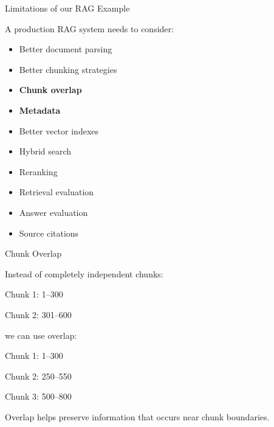 \documentclass[aspectratio=169]{beamer}
\begin{document}







\begin{frame}{Limitations of our RAG Example}


A production RAG system needs to consider:

\begin{itemize}
    \item Better document parsing
    \item Better chunking strategies
    \item \textbf{Chunk overlap}
    \item \textbf{Metadata}
    \item Better vector indexes
    \item Hybrid search
    \item Reranking
    \item Retrieval evaluation
    \item Answer evaluation
    \item Source citations
\end{itemize}

\end{frame}

\begin{frame}{Chunk Overlap}

Instead of completely independent chunks:

\begin{center}
Chunk 1: 1--300

Chunk 2: 301--600
\end{center}

we can use overlap:

\begin{center}
Chunk 1: 1--300

Chunk 2: 250--550

Chunk 3: 500--800
\end{center}

Overlap helps preserve information that occurs
near chunk boundaries.

\end{frame}
\end{document}
